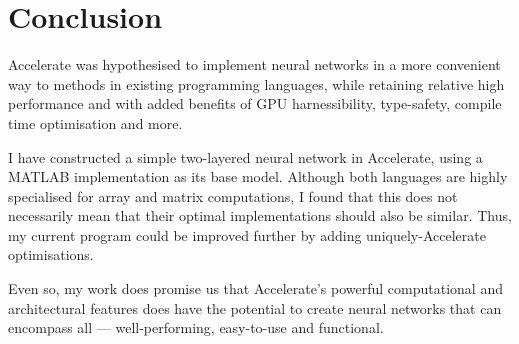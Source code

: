 \chapter{Conclusion}\label{ch:conclusion}

Accelerate was hypothesised to implement neural networks in a more convenient way to methods in existing programming languages, while retaining relative high performance and with added benefits of GPU harnessibility, type-safety, compile time optimisation and more.

I have constructed a simple two-layered neural network in Accelerate, using a MATLAB implementation as its base model. Although both languages are highly specialised for array and matrix computations, I found that this does not necessarily mean that their optimal implementations should also be similar. Thus, my current program could be improved further by adding uniquely-Accelerate optimisations. 

Even so, my work does promise us that Accelerate's powerful computational and architectural features does have the potential to create neural networks that can encompass all --- well-performing, easy-to-use and functional.